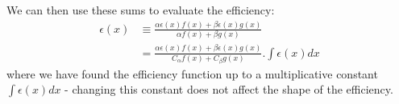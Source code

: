 \documentclass{article}
\begin{document}
We can then use these sums to evaluate the efficiency:
\begin{equation}
    \begin{aligned}
        \epsilon(x) & \equiv \frac{\alpha\epsilon(x)f(x) + \beta\epsilon(x)g(x)}{\alpha f(x) + \beta g(x)}                    \\
                    & = \frac{\alpha\epsilon(x)f(x) + \beta\epsilon(x)g(x)}{C_\alpha f(x) + C_\beta g(x)} . \int\epsilon(x)dx
    \end{aligned}
    \label{efficiency_expression}
\end{equation}
where we have found the efficiency function up to a multiplicative constant $\int\epsilon(x)dx$ - changing this constant
does not affect the shape of the efficiency.
\end{document}
